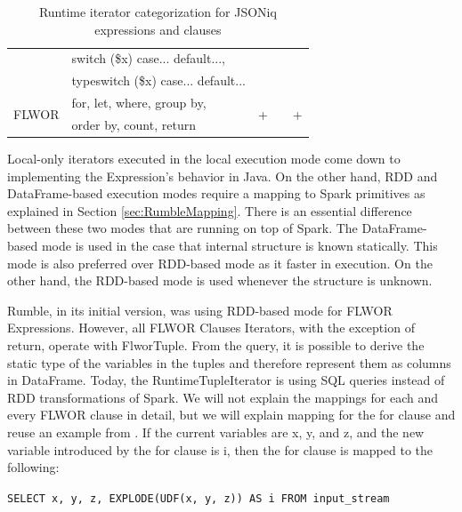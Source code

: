 \begin{table}[h!]
{\begin{tabular}{|l|l|l|l|l|}
		\cline{2-2}
		& switch (\$x) case... default...,                           &                    &                    &                     \\ 
		\cline{2-2}
		& typeswitch (\$x) case... default...                        &                    &                    &                     \\ 
		\hline
		\multirow{2}{*}{FLWOR}                 & for, let, where, group by,                                 & \multirow{2}{*}{+} & \multirow{2}{*}{}  & \multirow{2}{*}{+}  \\ 
		\cline{2-2}
		& order by, count, return                                    &                    &                    &                     \\
		\hline
\end{tabular}}
	\caption{Runtime iterator categorization for JSONiq expressions and clauses}
	\label{tab:RuntimeCategoriesMapping}
	\vspace{-3mm}
\end{table}

Local-only iterators executed in the local execution mode come down to implementing the Expression's behavior in Java. On the other hand, RDD and DataFrame-based execution modes require a mapping to Spark primitives as explained in Section \ref{sec:RumbleMapping}. There is an essential difference between these two modes that are running on top of Spark. The DataFrame-based mode is used in the case that internal structure is known statically. This mode is also preferred over RDD-based mode as it faster in execution. On the other hand, the RDD-based mode is used whenever the structure is unknown. 

Rumble, in its initial version, was using RDD-based mode for FLWOR Expressions. However, all FLWOR Clauses Iterators, with the exception of return, operate with FlworTuple. From the query, it is possible to derive the static type of the variables in the tuples and therefore represent them as columns in DataFrame. Today, the RuntimeTupleIterator is using SQL queries instead of RDD transformations of Spark. We will not explain the mappings for each and every FLWOR clause in detail, but we will explain mapping for the for clause and reuse an example from \cite{RumblePaper}. If the current variables are x, y, and z, and the new variable introduced by the for clause is i, then the for clause is mapped to the following:

\texttt{SELECT x, y, z, EXPLODE(UDF(x, y, z)) AS i FROM input\_stream}

